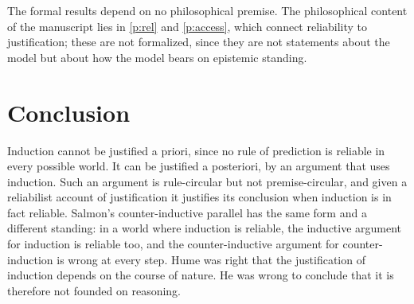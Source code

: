 \documentclass{situationist-preprint}
\begin{document}
The formal results depend on no philosophical premise. The philosophical content of the manuscript lies in \ref{p:rel} and \ref{p:access}, which connect reliability to justification; these are not formalized, since they are not statements about the model but about how the model bears on epistemic standing.

\section{Conclusion}

Induction cannot be justified a priori, since no rule of prediction is reliable in every possible world. It can be justified a posteriori, by an argument that uses induction. Such an argument is rule-circular but not premise-circular, and given a reliabilist account of justification it justifies its conclusion when induction is in fact reliable. Salmon's counter-inductive parallel has the same form and a different standing: in a world where induction is reliable, the inductive argument for induction is reliable too, and the counter-inductive argument for counter-induction is wrong at every step. Hume was right that the justification of induction depends on the course of nature. He was wrong to conclude that it is therefore not founded on reasoning.
\end{document}
